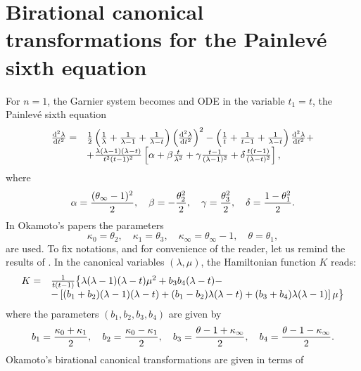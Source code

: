 \documentclass[12pt]{article}
\theoremstyle{definition}
\theoremstyle{theorem}
\begin{document}
\section{Birational canonical transformations for the Painlev\'e sixth 
equation}

For $n=1$, the Garnier system becomes and ODE in the variable $t_1=t$,
the Painlev\'e sixth equation
$$
\begin{array}{ll}
{{\rm d}^2\lambda\over{\rm d}t^2}=&{1\over2}\left({1\over \lambda}+
{1\over \lambda-1}+{1\over \lambda-t}\right)
\left({{\rm d}^2\lambda\over{\rm d}t^2}\right)^2 -
\left({1\over t}+{1\over t-1}+
{1\over \lambda-t}\right){{\rm d}^2\lambda\over{\rm d}t^2}+\\
&+{\lambda(\lambda-1)(\lambda-t)\over t^2(t-1)^2}
\left[\alpha+\beta {t\over \lambda^2}+
\gamma{t-1\over(\lambda-1)^2}+
\delta {t(t-1)\over(\lambda-t)^2}\right],\\
\end{array}
$$
where
\begin{equation}
\alpha={(\theta_\infty-1)^2\over2},\quad\beta=-{\theta_2^2\over2},
\quad\gamma={\theta_3^2\over2},\quad\delta={1-\theta_1^2\over2}.
\label{pa}\end{equation}
In Okamoto's papers the parameters 
\begin{equation}
\kappa_0=\theta_2,\quad \kappa_1=\theta_3,\quad  
\kappa_\infty=\theta_\infty-1,\quad 
\theta=\theta_1,
\label{relo}\end{equation}
are used. To fix notations, and for convenience of the reader, let us 
remind the results of \cite{Ok2}. In the canonical variables $(\lambda,\mu)$, 
the Hamiltonian function $K$ reads:
\begin{equation}
\begin{array}{ll}
K= & {1\over  t(t-1)} \big\{\lambda(\lambda-1)(\lambda-t) \mu^2
+b_3 b_4 (\lambda-t)-\\
&-\left[(b_1+b_2)(\lambda-1)(\lambda-t)+(b_1-b_2)\lambda(\lambda-t)+
(b_3+b_4)\lambda(\lambda-1)\right] \mu\big\}\\ 
\end{array}\label{2.1}
\end{equation}
where the parameters $(b_1,b_2,b_3,b_4)$ are given by
\begin{equation}
b_1={\kappa_0+\kappa_1\over 2},\quad
b_2={\kappa_0-\kappa_1\over 2},\quad   
b_3={\theta-1+\kappa_\infty\over 2},\quad
b_4={\theta-1-\kappa_\infty\over 2}.\label{2.2}
\end{equation}
Okamoto's birational canonical transformations are given in terms of 
\end{document}
